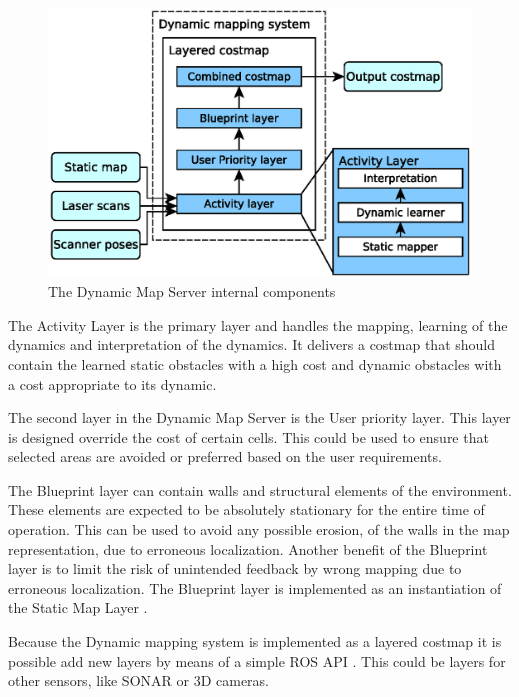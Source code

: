 \begin{figure}[htbp]
	\centering
	\includegraphics[scale=0.7]{chapters/cost_interpretation/figures/implementation_overview.eps}
	\caption{The Dynamic Map Server internal components}
	\label{fig:dynamic_map_server_internal}
\end{figure}

The Activity Layer is the primary layer and handles the mapping, learning of the dynamics and interpretation of the dynamics. It delivers a costmap that should contain the learned static obstacles with a high cost and dynamic obstacles with a cost appropriate to its dynamic. 

The second layer in the Dynamic Map Server is the User priority layer. This layer is designed override the cost of certain cells. This could be used to ensure that selected areas are avoided or preferred based on the user requirements. 

The Blueprint layer can contain walls and structural elements of the environment.
These elements are expected to be absolutely stationary for the entire time of operation.
This can be used to avoid any possible erosion, of the walls in the map representation, due to erroneous localization.
Another benefit of the Blueprint layer is to limit the risk of unintended feedback by wrong mapping due to  erroneous localization.
The Blueprint layer is implemented as an instantiation of the Static Map Layer \cite{lu2014layered}. 

Because the Dynamic mapping system is implemented as a layered costmap it is possible add new layers by means of a simple ROS API \cite{plugin_lib}. This could be layers for other sensors, like SONAR \cite{range_sensor_layer} or 3D cameras.
